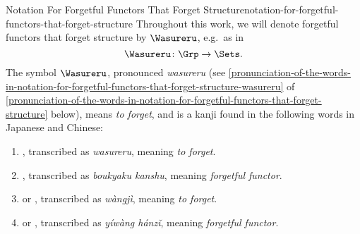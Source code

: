 \begin{notation}{Notation For Forgetful Functors That Forget Structure}{notation-for-forgetful-functors-that-forget-structure}%
    Throughout this work, we will denote forgetful functors that forget structure by $\Wasureru$, e.g.\ as in
    \[
        \Wasureru%
        \colon%
        \Grp%
        \to%
        \Sets.%
    \]%
    The symbol $\Wasureru$, pronounced \emph{wasureru} (see \cref{pronunciation-of-the-words-in-notation-for-forgetful-functors-that-forget-structure-wasureru} of \cref{pronunciation-of-the-words-in-notation-for-forgetful-functors-that-forget-structure} below), means \emph{to forget}, and is a kanji found in the following words in Japanese and Chinese:
    \begin{enumerate}
        \item\label{notation-for-forgetful-functors-wasureru}, transcribed as \emph{wasureru}, meaning \emph{to forget}.
        \item\label{notation-for-forgetful-functors-boukyaku-kanshu}, transcribed as \emph{boukyaku kanshu}, meaning \emph{forgetful functor}.
        \item\label{notation-for-forgetful-functors-wang-ji} or , transcribed as \emph{wàngjì}, meaning \emph{to forget}.
        \item\label{notation-for-forgetful-functors-yiwang-hanzi} or , transcribed as \emph{yíwàng hánzǐ}, meaning \emph{forgetful functor}.
    \end{enumerate}
\end{notation}
